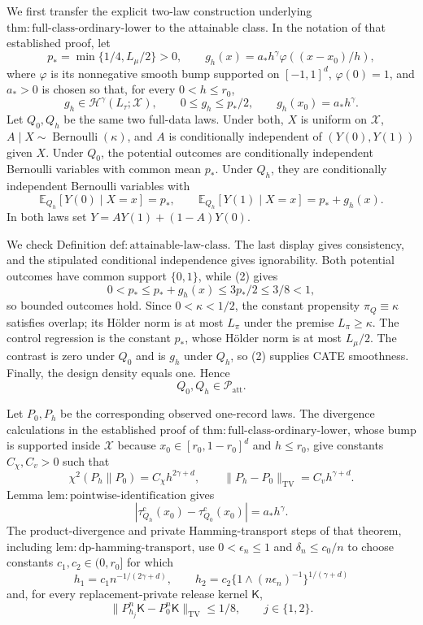 We first transfer the explicit two-law construction underlying \(\mathrm{thm{:}full\text{-}class\text{-}ordinary\text{-}lower}\) to the attainable class.  In the notation of that established proof, let
\[
 p_* =\min\{1/4,L_\mu/2\}>0,
 \qquad
 g_h(x)=a_*h^\gamma\varphi((x-x_0)/h),
\tag{1}
\]
where \(\varphi\) is its nonnegative smooth bump supported on \([-1,1]^d\), \(\varphi(0)=1\), and \(a_*>0\) is chosen so that, for every \(0<h\le r_0\),
\[
 g_h\in\mathcal H^\gamma(L_\tau;\mathcal X),
 \qquad 0\le g_h\le p_*/2,
 \qquad g_h(x_0)=a_*h^\gamma.
\tag{2}
\]
Let \(Q_0,Q_h\) be the same two full-data laws.  Under both, \(X\) is uniform on \(\mathcal X\), \(A\mid X\sim\operatorname{Bernoulli}(\kappa)\), and \(A\) is conditionally independent of \((Y(0),Y(1))\) given \(X\).  Under \(Q_0\), the potential outcomes are conditionally independent Bernoulli variables with common mean \(p_*\).  Under \(Q_h\), they are conditionally independent Bernoulli variables with
\[
 \mathbb E_{Q_h}[Y(0)\mid X=x]=p_*,
 \qquad
 \mathbb E_{Q_h}[Y(1)\mid X=x]=p_*+g_h(x).
\tag{3}
\]
In both laws set \(Y=AY(1)+(1-A)Y(0)\).

We check Definition \(\mathrm{def{:}attainable\text{-}law\text{-}class}\).  The last display gives consistency, and the stipulated conditional independence gives ignorability.  Both potential outcomes have common support \(\{0,1\}\), while (2) gives
\[
 0<p_*\le p_*+g_h(x)\le3p_*/2\le3/8<1,
\]
so bounded outcomes hold.  Since \(0<\kappa<1/2\), the constant propensity \(\pi_Q\equiv\kappa\) satisfies overlap; its H\"older norm is at most \(L_\pi\) under the premise \(L_\pi\ge\kappa\).  The control regression is the constant \(p_*\), whose H\"older norm is at most \(L_\mu/2\).  The contrast is zero under \(Q_0\) and is \(g_h\) under \(Q_h\), so (2) supplies CATE smoothness.  Finally, the design density equals one.  Hence
\[
 Q_0,Q_h\in\mathcal P_{\mathrm{att}}.
\tag{4}
\]

Let \(P_0,P_h\) be the corresponding observed one-record laws.  The divergence calculations in the established proof of \(\mathrm{thm{:}full\text{-}class\text{-}ordinary\text{-}lower}\), whose bump is supported inside \(\mathcal X\) because \(x_0\in[r_0,1-r_0]^d\) and \(h\le r_0\), give constants \(C_\chi,C_v>0\) such that
\[
 \chi^2(P_h\|P_0)=C_\chi h^{2\gamma+d},
 \qquad
 \|P_h-P_0\|_{\mathrm{TV}}=C_vh^{\gamma+d}.
\tag{5}
\]
Lemma \(\mathrm{lem{:}pointwise\text{-}identification}\) gives
\[
 |\tau_{Q_h}^{\mathrm c}(x_0)-\tau_{Q_0}^{\mathrm c}(x_0)|
 =a_*h^\gamma.
\tag{6}
\]
The product-divergence and private Hamming-transport steps of that theorem, including \(\mathrm{lem{:}dp\text{-}hamming\text{-}transport}\), use \(0<\epsilon_n\le1\) and \(\delta_n\le c_0/n\) to choose constants \(c_1,c_2\in(0,r_0]\) for which
\[
 h_1=c_1n^{-1/(2\gamma+d)},
 \qquad
 h_2=c_2\{1\wedge(n\epsilon_n)^{-1}\}^{1/(\gamma+d)}
\tag{7}
\]
and, for every replacement-private release kernel \(\mathsf K\),
\[
 \|P_{h_j}^n\mathsf K-P_0^n\mathsf K\|_{\mathrm{TV}}\le1/8,
 \qquad j\in\{1,2\}.
\tag{8}
\]

